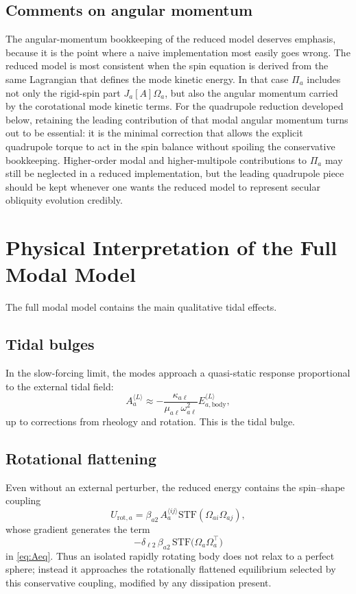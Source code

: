 \documentclass[journal, a4paper]{IEEEtran}
\begin{document}
\subsection{Comments on angular momentum}

The angular-momentum bookkeeping of the reduced model deserves emphasis,
because it is the point where a naive implementation most easily goes wrong.
The reduced model is most consistent when the spin equation is derived from
the same Lagrangian that defines the mode kinetic energy. In that case
$\Pi_a$ includes not only the rigid-spin part $J_a[A]\Omega_a$, but also the
angular momentum carried by the corotational mode kinetic terms. For the
quadrupole reduction developed below, retaining the leading contribution of
that modal angular momentum turns out to be essential: it is the minimal
correction that allows the explicit quadrupole torque to act in the spin
balance without spoiling the conservative bookkeeping. Higher-order modal and
higher-multipole contributions to $\Pi_a$ may still be neglected in a reduced
implementation, but the leading quadrupole piece should be kept whenever one
wants the reduced model to represent secular obliquity evolution credibly.

\section{Physical Interpretation of the Full Modal Model}

The full modal model contains the main qualitative tidal effects.

\subsection{Tidal bulges}

In the slow-forcing limit, the modes approach a quasi-static response
proportional to the external tidal field:
\begin{equation}
A_a^{\langle L\rangle}
\approx
-\frac{\kappa_{a\ell}}
{\mu_{a\ell}\omega_{a\ell}^2}
E_{a,\mathrm{body}}^{\langle L\rangle},
\label{eq:Astatic}
\end{equation}
up to corrections from rheology and rotation. This is the tidal bulge.

\subsection{Rotational flattening}

Even without an external perturber, the reduced energy contains the
spin--shape coupling
\begin{equation}
U_{\mathrm{rot},a}
=
\beta_{a2}\,A_a^{\langle ij\rangle}
\mathrm{STF}\!\left(\Omega_{ai}\Omega_{aj}\right),
\end{equation}
whose gradient generates the term
\begin{equation}
-\delta_{\ell2}\,\beta_{a2}\,
\mathrm{STF}
\bigl(
\Omega_a\Omega_a^\top
\bigr)
\end{equation}
in \eqref{eq:Aeq}. Thus an isolated rapidly rotating body does not relax to a
perfect sphere; instead it approaches the rotationally flattened equilibrium
selected by this conservative coupling, modified by any dissipation present.
\end{document}
